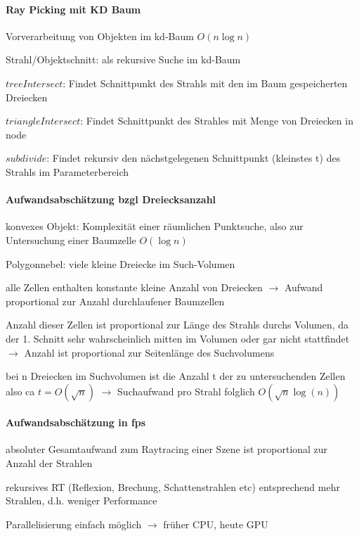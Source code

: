 \documentclass[landscape]{article}
\begin{document}
\begin{multicols}{3}
  \paragraph{Ray Picking mit KD Baum}
  \begin{itemize*}
    \item Vorverarbeitung von Objekten im kd-Baum $O(n \log n)$
    \item Strahl/Objektschnitt: als rekursive Suche im kd-Baum
    \item $treeIntersect$: Findet Schnittpunkt des Strahls mit den im Baum gespeicherten Dreiecken
    \item $triangleIntersect$: Findet Schnittpunkt des Strahles mit Menge von Dreiecken in node
    \item $subdivide$: Findet rekursiv den nächstgelegenen Schnittpunkt (kleinstes t) des Strahls im Parameterbereich 
  \end{itemize*}
  
  \paragraph{Aufwandsabschätzung bzgl Dreiecksanzahl}
  \begin{itemize*}
    \item konvexes Objekt: Komplexität einer räumlichen Punktsuche, also zur Untersuchung einer Baumzelle $O(\log n)$
    \item Polygonnebel: viele kleine Dreiecke im Such-Volumen
    \item alle Zellen enthalten konstante kleine Anzahl von Dreiecken $\rightarrow$ Aufwand proportional zur Anzahl durchlaufener Baumzellen
    \item Anzahl dieser Zellen ist proportional zur Länge des Strahls durchs Volumen, da der 1. Schnitt sehr wahrscheinlich mitten im Volumen oder gar nicht stattfindet $\rightarrow$ Anzahl ist proportional zur Seitenlänge des Suchvolumens
    \item bei n Dreiecken im Suchvolumen ist die Anzahl t der zu untersuchenden Zellen also ca $t=O(\sqrt{n})$ $\rightarrow$ Suchaufwand pro Strahl folglich $O(\sqrt{n} \log (n))$
  \end{itemize*}
  
  \paragraph{Aufwandsabschätzung in fps}
  \begin{itemize*}
    \item absoluter Gesamtaufwand zum Raytracing einer Szene ist proportional zur Anzahl der Strahlen
    \item rekursives RT (Reflexion, Brechung, Schattenstrahlen etc) entsprechend mehr Strahlen, d.h. weniger Performance
    \item Parallelisierung einfach möglich $\rightarrow$ früher CPU, heute GPU
  \end{itemize*}
  

\end{multicols}
\end{document}
